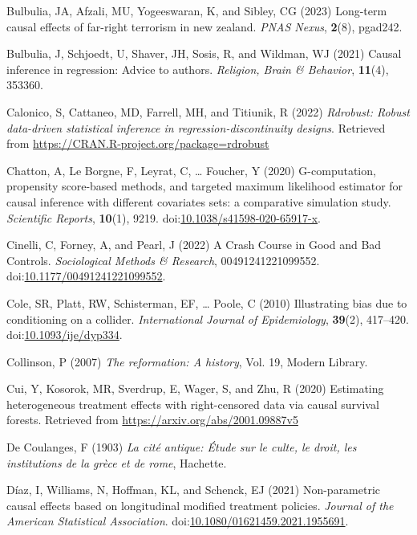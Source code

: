\documentclass[
  singlecolumn,
  9pt]{article}
\begin{document}
\begin{CSLReferences}
Bulbulia, JA, Afzali, MU, Yogeeswaran, K, and Sibley, CG (2023)
Long-term causal effects of far-right terrorism in new zealand.
\emph{PNAS Nexus}, \textbf{2}(8), pgad242.

Bulbulia, J, Schjoedt, U, Shaver, JH, Sosis, R, and Wildman, WJ (2021)
Causal inference in regression: Advice to authors. \emph{Religion, Brain
\& Behavior}, \textbf{11}(4), 353360.

Calonico, S, Cattaneo, MD, Farrell, MH, and Titiunik, R (2022)
\emph{Rdrobust: Robust data-driven statistical inference in
regression-discontinuity designs}. Retrieved from
\url{https://CRAN.R-project.org/package=rdrobust}

Chatton, A, Le Borgne, F, Leyrat, C, \ldots{} Foucher, Y (2020)
G-computation, propensity score-based methods, and targeted maximum
likelihood estimator for causal inference with different covariates
sets: a comparative simulation study. \emph{Scientific Reports},
\textbf{10}(1), 9219.
doi:\href{https://doi.org/10.1038/s41598-020-65917-x}{10.1038/s41598-020-65917-x}.

Cinelli, C, Forney, A, and Pearl, J (2022) A Crash Course in Good and
Bad Controls. \emph{Sociological Methods \& Research},
00491241221099552.
doi:\href{https://doi.org/10.1177/00491241221099552}{10.1177/00491241221099552}.

Cole, SR, Platt, RW, Schisterman, EF, \ldots{} Poole, C (2010)
Illustrating bias due to conditioning on a collider. \emph{International
Journal of Epidemiology}, \textbf{39}(2), 417--420.
doi:\href{https://doi.org/10.1093/ije/dyp334}{10.1093/ije/dyp334}.

Collinson, P (2007) \emph{The reformation: A history}, Vol. 19, Modern
Library.

Cui, Y, Kosorok, MR, Sverdrup, E, Wager, S, and Zhu, R (2020) Estimating
heterogeneous treatment effects with right-censored data via causal
survival forests. Retrieved from
\url{https://arxiv.org/abs/2001.09887v5}

De Coulanges, F (1903) \emph{La cité antique: Étude sur le culte, le
droit, les institutions de la grèce et de rome}, Hachette.

Díaz, I, Williams, N, Hoffman, KL, and Schenck, EJ (2021) Non-parametric
causal effects based on longitudinal modified treatment policies.
\emph{Journal of the American Statistical Association}.
doi:\href{https://doi.org/10.1080/01621459.2021.1955691}{10.1080/01621459.2021.1955691}.


\end{CSLReferences}
\end{document}
